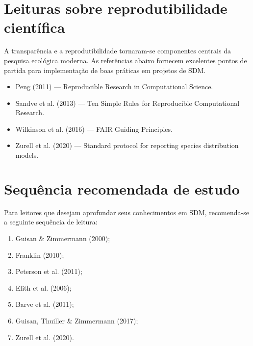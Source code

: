 \documentclass{ueap-sdm}
\begin{document}
\section{Leituras sobre reprodutibilidade científica}

A transparência e a reprodutibilidade tornaram-se componentes centrais da
pesquisa ecológica moderna. As referências abaixo fornecem excelentes pontos de
partida para implementação de boas práticas em projetos de SDM.

\begin{itemize}
	
	\item Peng (2011) --- Reproducible Research in Computational Science.
	
	\item Sandve et al. (2013) --- Ten Simple Rules for Reproducible Computational Research.
	
	\item Wilkinson et al. (2016) --- FAIR Guiding Principles.
	
	\item Zurell et al. (2020) --- Standard protocol for reporting species distribution models.
	
\end{itemize}

\section{Sequência recomendada de estudo}

Para leitores que desejam aprofundar seus conhecimentos em SDM, recomenda-se a
seguinte sequência de leitura:

\begin{enumerate}
	
	\item Guisan \& Zimmermann (2000);
	
	\item Franklin (2010);
	
	\item Peterson et al. (2011);
	
	\item Elith et al. (2006);
	
	\item Barve et al. (2011);
	
	\item Guisan, Thuiller \& Zimmermann (2017);
	
	\item Zurell et al. (2020).
	
\end{enumerate}
\end{document}
